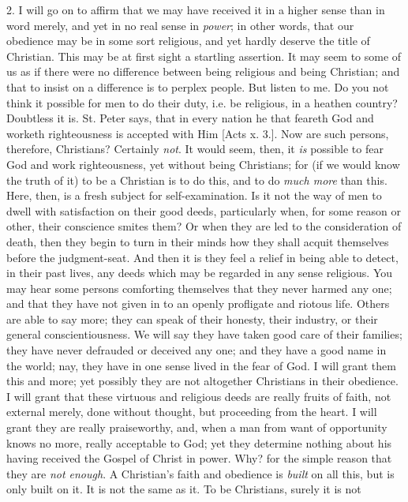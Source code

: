 2. I will go on to affirm that we may have received it
in a higher sense than in word merely, and yet in no real
sense in \emph{power}; in other words, that our
obedience may be in some sort religious, and yet hardly
deserve the title of Christian. This may be at first
sight a startling assertion. It may seem to some of us as
if there were no difference between being religious and
being Christian; and that to insist on a difference is to
perplex people. But listen to me. Do you not think it
possible for men to do their duty, i.e. be religious, in
a heathen country? Doubtless it is. St. Peter says, that
in every nation he that feareth God and worketh
righteousness is accepted with Him [Acts x. 3.]. Now are
such persons, therefore, Christians? Certainly \emph{not}.
It would seem, then, it \emph{is} possible to fear God
and work righteousness, yet without being Christians; for
(if we would know the truth of it) to be a Christian is
to do this, and to do \emph{much more} than this. Here,
then, is a fresh subject for self-examination. Is it not
the way of men to dwell with satisfaction on their good
deeds, particularly when, for some reason or other, their
conscience smites them? Or when they are led to the
consideration of death, then they begin to turn in their
minds how they shall acquit themselves before the
judgment-seat. And then it is they feel a relief in being
able to detect, in their past lives, any deeds which may
be regarded in any sense religious. You may hear some
persons comforting themselves that they never harmed any
one; and that they have not given in to an openly
profligate and riotous life. Others are able to say more;
they can speak of their honesty, their industry, or their
general conscientiousness. We will say they have taken
good care of their families; they have never defrauded or
deceived any one; and they have a good name in the world;
nay, they have in one sense lived in the fear of God. I
will grant them this and more; yet possibly they are not
altogether Christians in their obedience. I will grant
that these virtuous and religious deeds are really fruits
of faith, not external merely, done without thought, but
proceeding from the heart. I will grant they are really
praiseworthy, and, when a man from want of opportunity
knows no more, really acceptable to God; yet they
determine nothing about his having received the Gospel of
Christ in power. Why? for the simple reason that they are
\emph{not enough}. A Christian's faith and obedience is
\emph{built} on all this, but is only built on it. It
is not the same as it. To be Christians, surely it is not
